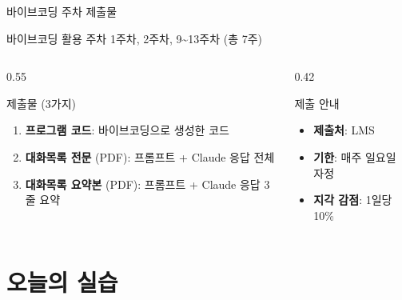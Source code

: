 \documentclass[aspectratio=169, 11pt]{beamer}
\begin{document}
\begin{frame}{바이브코딩 주차 제출물}
\begin{block}{바이브코딩 활용 주차}
1주차, 2주차, 9\textasciitilde13주차 (총 7주)
\end{block}

\begin{columns}[T, totalwidth=\textwidth]
\begin{column}{0.55\textwidth}
\begin{exampleblock}{제출물 (3가지)}
\small
\begin{enumerate}
    \item \textbf{프로그램 코드}: 바이브코딩으로 생성한 코드
    \item \textbf{대화목록 전문} (PDF): 프롬프트 + Claude 응답 전체
    \item \textbf{대화목록 요약본} (PDF): 프롬프트 + Claude 응답 3줄 요약
\end{enumerate}
\end{exampleblock}
\end{column}
\hfill
\begin{column}{0.42\textwidth}
\begin{alertblock}{제출 안내}
\small
\begin{itemize}
    \item \textbf{제출처}: LMS
    \item \textbf{기한}: 매주 일요일 자정
    \item \textbf{지각 감점}: 1일당 10\%
\end{itemize}
\end{alertblock}
\end{column}
\end{columns}
\end{frame}

\section{오늘의 실습}
\end{document}
